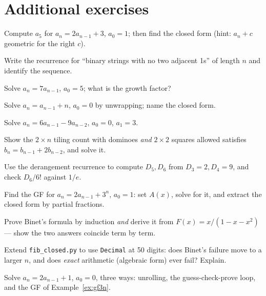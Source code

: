 \section{Additional exercises}
\begin{exercise}[easy]
Compute $a_5$ for $a_n = 2a_{n-1} + 3$, $a_0 = 1$; then find the closed
form (hint: $a_n + c$ geometric for the right $c$).
\end{exercise}
\begin{exercise}[easy]
Write the recurrence for ``binary strings with no two adjacent 1s'' of
length $n$ and identify the sequence.
\end{exercise}
\begin{exercise}[easy]
Solve $a_n = 7a_{n-1}$, $a_0 = 5$; what is the growth factor?
\end{exercise}
\begin{exercise}[easy]
Solve $a_n = a_{n-1} + n$, $a_0 = 0$ by unwrapping; name the closed
form.
\end{exercise}
\begin{exercise}[medium]
Solve $a_n = 6a_{n-1} - 9a_{n-2}$, $a_0 = 0$, $a_1 = 3$.
\end{exercise}
\begin{exercise}[medium]
Show the $2 \times n$ tiling count with dominoes \emph{and} $2\times2$
squares allowed satisfies $b_n = b_{n-1} + 2b_{n-2}$, and solve it.
\end{exercise}
\begin{exercise}[medium]
Use the derangement recurrence to compute $D_5, D_6$ from
$D_3 = 2, D_4 = 9$, and check $D_6/6!$ against $1/e$.
\end{exercise}
\begin{exercise}[medium]
Find the GF for $a_n = 2a_{n-1} + 3^n$, $a_0 = 1$: set $A(x)$, solve
for it, and extract the closed form by partial fractions.
\end{exercise}
\begin{exercise}[hard]
Prove Binet's formula by induction \emph{and} derive it from
$F(x) = x/(1-x-x^2)$ --- show the two answers coincide term by term.
\end{exercise}
\begin{exercise}[hard]
Extend \texttt{fib\_closed.py} to use \texttt{Decimal} at 50 digits:
does Binet's failure move to a larger $n$, and does \emph{exact}
arithmetic (algebraic form) ever fail? Explain.
\end{exercise}
\begin{exercise}[easy]
Solve $a_n = 2a_{n-1} + 1$, $a_0 = 0$, three ways: unrolling, the
guess-check-prove loop, and the GF of Example~\ref{ex:gf3n}.
\end{exercise}
